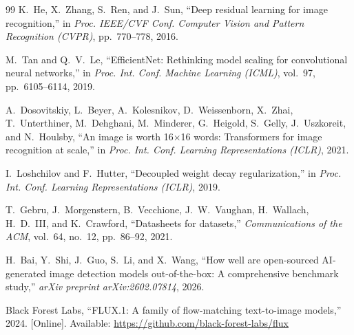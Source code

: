 \begin{thebibliography}{99}
K.~He, X.~Zhang, S.~Ren, and J.~Sun,
``Deep residual learning for image recognition,''
in \emph{Proc. IEEE/CVF Conf. Computer Vision and Pattern Recognition
(CVPR)}, pp.\ 770--778, 2016.

M.~Tan and Q.~V.~Le,
``EfficientNet: Rethinking model scaling for convolutional neural
networks,''
in \emph{Proc. Int. Conf. Machine Learning (ICML)},
vol.\ 97, pp.\ 6105--6114, 2019.

A.~Dosovitskiy, L.~Beyer, A.~Kolesnikov, D.~Weissenborn, X.~Zhai,
T.~Unterthiner, M.~Dehghani, M.~Minderer, G.~Heigold, S.~Gelly,
J.~Uszkoreit, and N.~Houlsby,
``An image is worth 16$\times$16 words: Transformers for image
recognition at scale,''
in \emph{Proc. Int. Conf. Learning Representations (ICLR)}, 2021.

I.~Loshchilov and F.~Hutter,
``Decoupled weight decay regularization,''
in \emph{Proc. Int. Conf. Learning Representations (ICLR)}, 2019.

T.~Gebru, J.~Morgenstern, B.~Vecchione, J.~W.~Vaughan,
H.~Wallach, H.~D.~III, and K.~Crawford,
``Datasheets for datasets,''
\emph{Communications of the ACM}, vol.\ 64, no.\ 12,
pp.\ 86--92, 2021.

H.~Bai, Y.~Shi, J.~Guo, S.~Li, and X.~Wang,
``How well are open-sourced AI-generated image detection models
out-of-the-box: A comprehensive benchmark study,''
\emph{arXiv preprint arXiv:2602.07814}, 2026.

Black Forest Labs,
``FLUX.1: A family of flow-matching text-to-image models,''
2024. [Online]. Available:
\url{https://github.com/black-forest-labs/flux}

\end{thebibliography}
